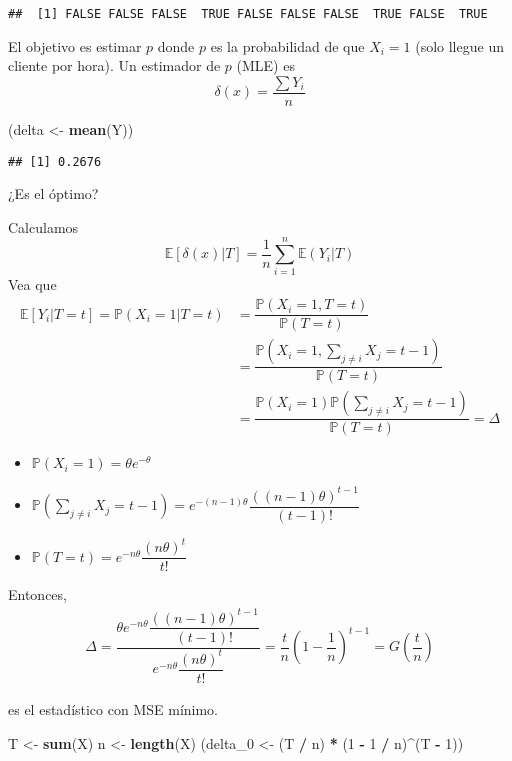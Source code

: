 \documentclass[
  12pt,
]{book}
\newenvironment{Shaded}{\begin{snugshade}}{\end{snugshade}}
\newcommand{\DecValTok}[1]{\textcolor[rgb]{0.00,0.00,0.81}{#1}}
\newcommand{\KeywordTok}[1]{\textcolor[rgb]{0.13,0.29,0.53}{\textbf{#1}}}
\newcommand{\NormalTok}[1]{#1}
\newcommand{\OperatorTok}[1]{\textcolor[rgb]{0.81,0.36,0.00}{\textbf{#1}}}
\newcommand{\StringTok}[1]{\textcolor[rgb]{0.31,0.60,0.02}{#1}}
\begin{document}
\begin{verbatim}
##  [1] FALSE FALSE FALSE  TRUE FALSE FALSE FALSE  TRUE FALSE  TRUE
\end{verbatim}

El objetivo es estimar \(p\) donde \(p\) es la probabilidad de que \(X_i =1\) (solo llegue un cliente por hora). Un estimador de \(p\) (MLE) es
\[\delta(x) = \dfrac{\sum Y_i}{n}\]

\begin{Shaded}
\begin{Highlighting}[]
\NormalTok{(delta \textless{}{-}}\StringTok{ }\KeywordTok{mean}\NormalTok{(Y))}
\end{Highlighting}
\end{Shaded}

\begin{verbatim}
## [1] 0.2676
\end{verbatim}

¿Es el óptimo?

Calculamos
\[\mathbb E[\delta(x)|T] = \dfrac 1n \sum_{i=1}^n \mathbb E (Y_i|T)\]
Vea que
\begin{align*}
\mathbb E[Y_i|T = t] = \mathbb P(X_i = 1 | T = t) & = \dfrac{\mathbb P(X_i = 1, T=t)}{\mathbb P(T=t)}\\
& = \dfrac{\mathbb P(X_i = 1, \sum_{j\ne i} X_j = t-1)}{\mathbb P(T=t)}\\
& = \dfrac{\mathbb P(X_i = 1) \mathbb P(\sum_{j\ne i} X_j = t-1)}{\mathbb P(T=t)} = \Delta
\end{align*}

\begin{itemize}
\item
  \(\mathbb P(X_i = 1) = \theta e^{-\theta}\)
\item
  \(\mathbb P(\sum_{j\ne i}X_j = t-1) = e^{-(n-1)\theta}\dfrac{((n-1)\theta)^{t-1}}{(t-1)!}\)
\item
  \(\mathbb P(T=t) = e^{-n\theta}\dfrac{(n\theta)^t}{t!}\)
\end{itemize}

Entonces,
\begin{align*}
\Delta = \dfrac{\theta e^{-n\theta}\dfrac{((n-1)\theta)^{t-1}}{(t-1)!}}{e^{-n\theta}\dfrac{(n\theta)^t}{t!}} = \dfrac tn \left(1-\dfrac 1n\right)^{t-1} = G\left(\dfrac tn\right)
\end{align*}

es el estadístico con MSE mínimo.

\begin{Shaded}
\begin{Highlighting}[]
\NormalTok{T \textless{}{-}}\StringTok{ }\KeywordTok{sum}\NormalTok{(X)}
\NormalTok{n \textless{}{-}}\StringTok{ }\KeywordTok{length}\NormalTok{(X)}
\NormalTok{(delta\_}\DecValTok{0}\NormalTok{ \textless{}{-}}\StringTok{ }\NormalTok{(T }\OperatorTok{/}\StringTok{ }\NormalTok{n) }\OperatorTok{*}\StringTok{ }\NormalTok{(}\DecValTok{1} \OperatorTok{{-}}\StringTok{ }\DecValTok{1} \OperatorTok{/}\StringTok{ }\NormalTok{n)}\OperatorTok{\^{}}\NormalTok{(T }\OperatorTok{{-}}\StringTok{ }\DecValTok{1}\NormalTok{))}
\end{Highlighting}
\end{Shaded}
\end{document}

